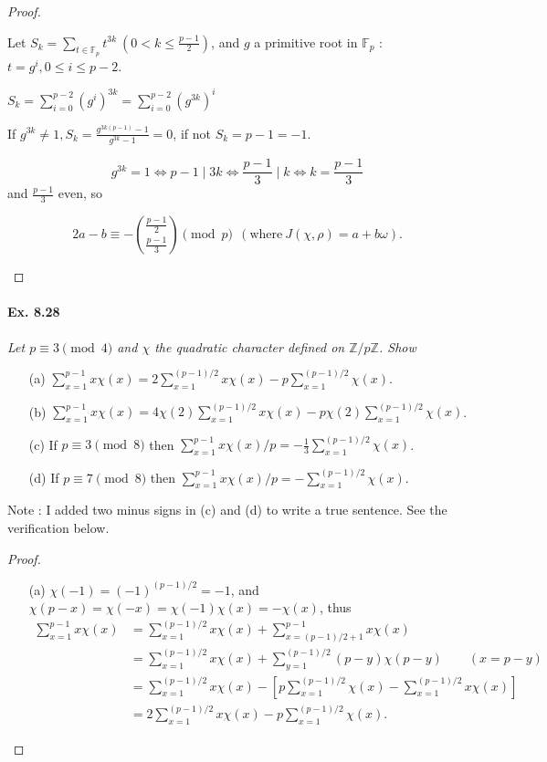 \documentclass[11pt,a4paper]{article}
\newcommand{\Z}{\mathbb{Z}}
\newcommand{\F}{\mathbb{F}}
\begin{document}
{\begin{proof}
\begin{enumerate}
Let $S_k = \sum\limits_{t \in \F_p}   t^{3k} \ (0<k\leq\frac{p-1}{2}) $, and $g$ a primitive root in $\F_p$ : $t = g^i, 0 \leq i \leq p-2$.

$S_k = \sum\limits_{i=0}^{p-2} (g^{i})^{3k}=\sum\limits_{i=0}^{p-2} (g^{3k})^i$

If $g^{3k} \ne 1 , S_k = \frac{g^{3k(p-1)}-1}{g^{3k}-1} = 0$, if not $S_k = p-1 = -1$.

$$g^{3k} = 1 \iff p-1 \mid 3k \iff \frac{p-1}{3} \mid k \iff k=\frac{p-1}{3}$$ and $\frac{p-1}{3}$ even, so

$$2a-b \equiv -\binom{\frac{p-1}{2}}{\frac{p-1}{3}}\pmod p \ \ (\mathrm{where}\ J(\chi,\rho) = a+b \omega).$$
\end{enumerate}
\end{proof}

\paragraph{Ex. 8.28}

{\it Let $p\equiv 3 \pmod 4$ and $\chi$ the quadratic character defined on $\Z/p\Z$. Show
\begin{enumerate}
\item[(a)] $\sum_{x=1}^{p-1} x\chi(x) = 2 \sum_{x=1}^{(p-1)/2} x\chi(x) - p \sum_{x=1}^{(p-1)/2} \chi(x)$.
\item[(b)] $\sum_{x=1}^{p-1} x\chi(x) =  4 \chi(2)\sum_{x=1}^{(p-1)/2} x \chi(x) - p \chi(2) \sum_{x=1}^{(p-1)/2}\chi(x)$.
\item[(c)] If $p\equiv 3 \pmod 8$ then $\sum_{x=1}^{p-1} x\chi(x)/p =- \frac{1}{3} \sum_{x=1}^{(p-1)/2} \chi(x)$.
\item[(d)] If $p \equiv 7 \pmod 8$ then $\sum_{x=1}^{p-1} x\chi(x)/p =- \sum_{x=1}^{(p-1)/2} \chi(x)$.
\end{enumerate}
}
Note : I added two minus signs in (c) and (d) to write a true sentence. See the verification below.
\begin{proof}
\begin{enumerate}
\item[(a)]  $\chi(-1) = (-1)^{(p-1)/2}=-1$, and $\chi(p-x) = \chi(-x) = \chi(-1) \chi(x) = -\chi(x)$, thus
\begin{align*}
\sum_{x=1}^{p-1} x \chi(x) &= \sum_{x=1}^{(p-1)/2} x \chi(x)+ \sum_{x=(p-1)/2+1}^{p-1} x \chi(x)\\
&=\sum_{x=1}^{(p-1)/2} x \chi(x) + \sum_{y=1}^{(p-1)/2} (p-y) \chi(p-y)\qquad (x = p-y)\\
&=\sum_{x=1}^{(p-1)/2} x \chi(x) -\left [ p\sum_{x=1}^{(p-1)/2}  \chi(x) - \sum_{x=1}^{(p-1)/2} x \chi(x)\right ]\\
&= 2 \sum_{x=1}^{(p-1)/2} x \chi(x) - p \sum_{x=1}^{(p-1)/2}  \chi(x).
\end{align*}



\end{enumerate}
\end{proof}}
\end{document}
